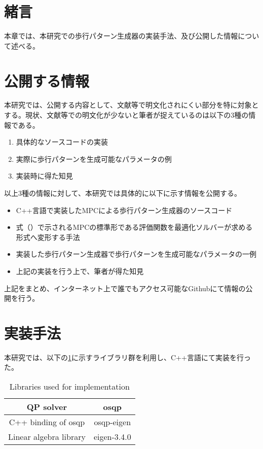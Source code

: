 \section{緒言}
本章では、本研究での歩行パターン生成器の実装手法、及び公開した情報について述べる。

\section{公開する情報}
本研究では、公開する内容として、文献等で明文化されにくい部分を特に対象とする。現状、文献等での明文化が少ないと筆者が捉えているのは以下の3種の情報である。
\begin{enumerate}
  \item 具体的なソースコードの実装
  \item 実際に歩行パターンを生成可能なパラメータの例
  \item 実装時に得た知見
\end{enumerate}

以上3種の情報に対して、本研究では具体的に以下に示す情報を公開する。

\begin{itemize}
  \item C++言語で実装したMPCによる歩行パターン生成器のソースコード
  \item 式（）で示されるMPCの標準形である評価関数を最適化ソルバーが求める形式へ変形する手法
  \item 実装した歩行パターン生成器で歩行パターンを生成可能なパラメータの一例
  \item 上記の実装を行う上で、筆者が得た知見
\end{itemize}

上記をまとめ、インターネット上で誰でもアクセス可能なGithub\cite{MYGITHUB}にて情報の公開を行う。

\section{実装手法}

本研究では、以下の\ref{tb:library}に示すライブラリ群を利用し、C++言語にて実装を行った。

\begin{table}[htbp]
  \centering
  \begin{tabular}{|c|c|} \hline
    QP solver & osqp\cite{OSQP} \\ \hline
    C++ binding of osqp &  osqp-eigen\cite{OSQPEIGEN} \\ \hline
    Linear algebra library &  eigen-3.4.0\cite{EIGEN} \\ \hline
  \end{tabular}
  \caption{Libraries used for implementation}
  \label{tb:library}
\end{table}



